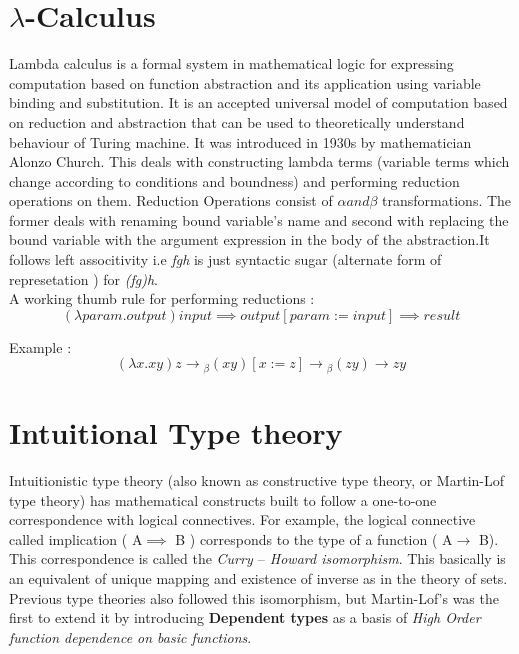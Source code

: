 \section{$\lambda$-Calculus}

Lambda calculus\cite{lambda_calculus} is a formal system in mathematical logic for expressing computation based on function abstraction and its application using variable binding and substitution. It is an accepted universal model of computation based on reduction and abstraction that can be used to theoretically understand behaviour of Turing machine. It was introduced in 1930s by mathematician Alonzo Church. This deals with constructing lambda terms (variable terms which change according to conditions and boundness) and performing reduction operations on them. Reduction Operations consist of $\alpha  and  \beta $ transformations. The former deals with renaming bound variable's name and second with replacing the bound variable with the argument expression in the body of the abstraction.It follows left associtivity i.e \textit{fgh} is just syntactic sugar (alternate form of represetation ) for \textit{(fg)h}.\\

A working thumb rule for performing reductions :
\[
 \boxed {(\lambda param . output)input \implies output [param := input] \implies result }
\]

Example : \[(\lambda x.xy)z \longrightarrow {}_\beta(xy)[x:=z] \longrightarrow {}_\beta (zy) \longrightarrow zy \]

 
\section{Intuitional Type theory} 

Intuitionistic type theory (also known as constructive type theory, or Martin-Lof type theory) has mathematical constructs  built to follow a one-to-one correspondence with logical connectives. For example, the logical connective called implication ( { A$\implies$ B} ) corresponds to the type of a function ( { A$\to$ B}). This correspondence is called the \textit{Curry $–$ Howard isomorphism}. This basically is an equivalent of unique mapping and existence of inverse as in the theory of sets. Previous type theories also followed this isomorphism, but Martin-Lof's was the first to extend it by introducing \textbf{Dependent types} as a basis of \textit{High Order function dependence on basic functions}.\\

